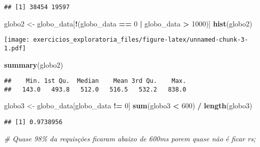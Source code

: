 \documentclass[
]{article}
\newenvironment{Shaded}{\begin{snugshade}}{\end{snugshade}}
\newcommand{\CommentTok}[1]{\textcolor[rgb]{0.56,0.35,0.01}{\textit{#1}}}
\newcommand{\DecValTok}[1]{\textcolor[rgb]{0.00,0.00,0.81}{#1}}
\newcommand{\FunctionTok}[1]{\textcolor[rgb]{0.13,0.29,0.53}{\textbf{#1}}}
\newcommand{\NormalTok}[1]{#1}
\newcommand{\OtherTok}[1]{\textcolor[rgb]{0.56,0.35,0.01}{#1}}
\newcommand{\SpecialCharTok}[1]{\textcolor[rgb]{0.81,0.36,0.00}{\textbf{#1}}}
\begin{document}
\begin{Shaded}
\end{Shaded}

\begin{verbatim}
## [1] 38454 19597
\end{verbatim}

\begin{Shaded}
\begin{Highlighting}[]
\NormalTok{globo2 }\OtherTok{\textless{}{-}}\NormalTok{ globo\_data[}\SpecialCharTok{!}\NormalTok{(globo\_data }\SpecialCharTok{==} \DecValTok{0} \SpecialCharTok{|}\NormalTok{ globo\_data }\SpecialCharTok{\textgreater{}} \DecValTok{1000}\NormalTok{)]}
\FunctionTok{hist}\NormalTok{(globo2)}
\end{Highlighting}
\end{Shaded}

\texttt{[image: exercicios\_exploratoria\_files/figure-latex/unnamed-chunk-3-1.pdf]}

\begin{Shaded}
\begin{Highlighting}[]
\FunctionTok{summary}\NormalTok{(globo2)}
\end{Highlighting}
\end{Shaded}

\begin{verbatim}
##    Min. 1st Qu.  Median    Mean 3rd Qu.    Max. 
##   143.0   493.8   512.0   516.5   532.2   838.0
\end{verbatim}

\begin{Shaded}
\begin{Highlighting}[]
\NormalTok{globo3 }\OtherTok{\textless{}{-}}\NormalTok{ globo\_data[globo\_data }\SpecialCharTok{!=} \DecValTok{0}\NormalTok{]}
\FunctionTok{sum}\NormalTok{(globo3 }\SpecialCharTok{\textless{}} \DecValTok{600}\NormalTok{) }\SpecialCharTok{/} \FunctionTok{length}\NormalTok{(globo3) }
\end{Highlighting}
\end{Shaded}

\begin{verbatim}
## [1] 0.9738956
\end{verbatim}

\begin{Shaded}
\begin{Highlighting}[]
\CommentTok{\# Quase 98\% da requisções ficaram abaixo de 600ms porem quase não é ficar rs;}
\end{Highlighting}
\end{Shaded}
\end{document}
